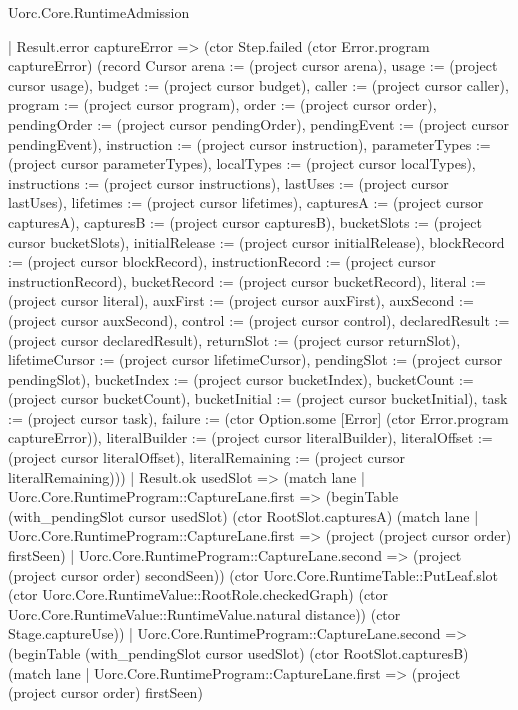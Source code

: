 \begin{lexlean}{Uorc.Core.RuntimeAdmission}
\begin{semanticmodule}
{                  | Result.error captureError => (ctor Step.failed (ctor Error.program captureError) (record Cursor {arena := (project cursor arena), usage := (project cursor usage), budget := (project cursor budget), caller := (project cursor caller), program := (project cursor program), order := (project cursor order), pendingOrder := (project cursor pendingOrder), pendingEvent := (project cursor pendingEvent), instruction := (project cursor instruction), parameterTypes := (project cursor parameterTypes), localTypes := (project cursor localTypes), instructions := (project cursor instructions), lastUses := (project cursor lastUses), lifetimes := (project cursor lifetimes), capturesA := (project cursor capturesA), capturesB := (project cursor capturesB), bucketSlots := (project cursor bucketSlots), initialRelease := (project cursor initialRelease), blockRecord := (project cursor blockRecord), instructionRecord := (project cursor instructionRecord), bucketRecord := (project cursor bucketRecord), literal := (project cursor literal), auxFirst := (project cursor auxFirst), auxSecond := (project cursor auxSecond), control := (project cursor control), declaredResult := (project cursor declaredResult), returnSlot := (project cursor returnSlot), lifetimeCursor := (project cursor lifetimeCursor), pendingSlot := (project cursor pendingSlot), bucketIndex := (project cursor bucketIndex), bucketCount := (project cursor bucketCount), bucketInitial := (project cursor bucketInitial), task := (project cursor task), failure := (ctor Option.some [Error] (ctor Error.program captureError)), literalBuilder := (project cursor literalBuilder), literalOffset := (project cursor literalOffset), literalRemaining := (project cursor literalRemaining)}))
                  | Result.ok usedSlot => (match lane
                    | Uorc.Core.RuntimeProgram::CaptureLane.first => (beginTable (with_pendingSlot cursor usedSlot) (ctor RootSlot.capturesA) (match lane
                      | Uorc.Core.RuntimeProgram::CaptureLane.first => (project (project cursor order) firstSeen)
                      | Uorc.Core.RuntimeProgram::CaptureLane.second => (project (project cursor order) secondSeen)) (ctor Uorc.Core.RuntimeTable::PutLeaf.slot (ctor Uorc.Core.RuntimeValue::RootRole.checkedGraph) (ctor Uorc.Core.RuntimeValue::RuntimeValue.natural distance)) (ctor Stage.captureUse))
                    | Uorc.Core.RuntimeProgram::CaptureLane.second => (beginTable (with_pendingSlot cursor usedSlot) (ctor RootSlot.capturesB) (match lane
                      | Uorc.Core.RuntimeProgram::CaptureLane.first => (project (project cursor order) firstSeen)
}
\end{semanticmodule}
\end{lexlean}

